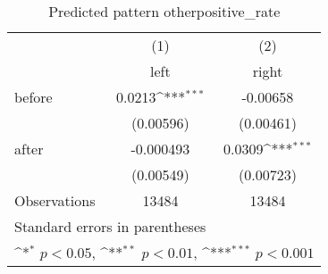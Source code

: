 \begin{table}[htbp]\centering
\def\sym#1{\ifmmode^{#1}\else\(^{#1}\)\fi}
\caption{Predicted pattern otherpositive\_rate}
\begin{tabular}{l*{2}{c}}
\hline\hline
                    &\multicolumn{1}{c}{(1)}&\multicolumn{1}{c}{(2)}\\
                    &\multicolumn{1}{c}{left}&\multicolumn{1}{c}{right}\\
\hline
before              &      0.0213\sym{***}&    -0.00658         \\
                    &   (0.00596)         &   (0.00461)         \\
[1em]
after               &   -0.000493         &      0.0309\sym{***}\\
                    &   (0.00549)         &   (0.00723)         \\
\hline
Observations        &       13484         &       13484         \\
\hline\hline
\multicolumn{3}{l}{\footnotesize Standard errors in parentheses}\\
\multicolumn{3}{l}{\footnotesize \sym{*} \(p<0.05\), \sym{**} \(p<0.01\), \sym{***} \(p<0.001\)}\\
\end{tabular}
\end{table}
